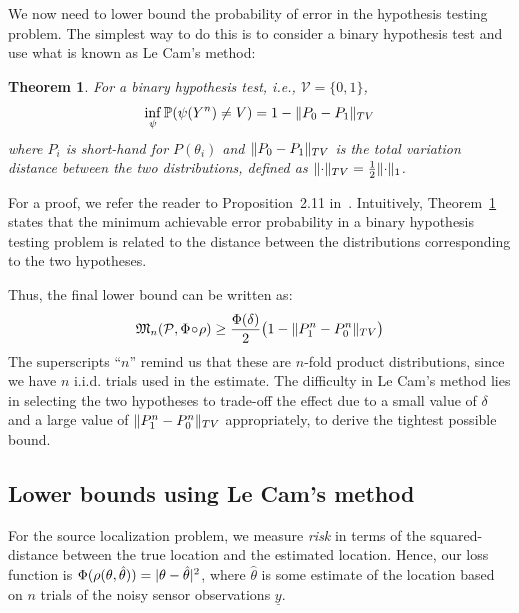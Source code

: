 \documentclass[conference]{IEEEtran}
\providecommand{\v}{}
\renewcommand{\v}[1]{\underline{#1}}
\DeclarePairedDelimiter\abs{\lvert}{\rvert}
\DeclarePairedDelimiter\norm{\lVert}{\rVert}
\newcommand{\Phiorho}{\Phi\!\circ\!\rho}
\newtheorem{theorem}{Theorem}
\begin{document}
We now need to lower bound the probability of error in the hypothesis testing
problem. The simplest way to do this is to consider a binary hypothesis test
and use what is known as Le Cam's method:
\begin{theorem} \label{thm:le-cam}
	For a binary hypothesis test, i.e., $\mathcal{V} = \{0, 1\}$,
	\begin{equation}
		\inf_\psi \mathbb P(\psi(Y^n) \neq V) = 1 - \norm{P_0 - P_1}_{TV}
	\end{equation}
	where $P_i$ is short-hand for $P(\theta_i)$ and $\norm{P_0 - P_1}_{TV}$ is
	the total variation distance between the two distributions, defined as
	$\norm{\cdot}_{TV} = \frac{1}{2} \norm{\cdot}_1$.
\end{theorem}
For a proof, we refer the reader to Proposition~2.11
in~\cite{Duchi2015Information}. Intuitively, Theorem~\ref{thm:le-cam} states
that the minimum achievable error probability in a binary hypothesis testing
problem is related to the distance between the distributions corresponding to
the two hypotheses.

Thus, the final lower bound can be written as:
\begin{equation} \label{eq:le-cam-bound}
	\mathfrak{M}_n(\mathcal P, \Phiorho) \geq \frac{\Phi(\delta)}{2} \big(1 - \norm{P_1^n - P_0^n}_{TV}\big)
\end{equation}
The superscripts ``$n$'' remind us that these are $n$-fold product
distributions, since we have $n$ i.i.d. trials used in the estimate.  The
difficulty in Le Cam's method lies in selecting the two hypotheses to trade-off
the effect due to a small value of $\delta$ and a large value of $\norm{P_1^n -
P_0^n}_{TV}$ appropriately, to derive the tightest possible bound.

\subsection{Lower bounds using Le Cam's method}
\label{sec:lecam-lb}

For the source localization problem, we measure \emph{risk} in terms of the
squared-distance between the true location and the estimated location. Hence,
our loss function is $\Phi(\rho(\theta, \hat\theta)) = \abs{\theta -
\hat\theta}^2$, where $\hat\theta$ is some estimate of the location based on
$n$ trials of the noisy sensor observations $\v y$.
\end{document}

